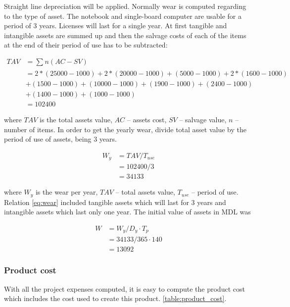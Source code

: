 Straight line depreciation will be applied. Normally wear is computed regarding to the type of asset. The notebook and single-board computer are usable for a period of 3 years. Licenses will last for a single year. At first tangible and intangible assets are summed up and then the salvage costs of each of the items at the end of their period of use has to be subtracted:

\begin{equation}
 \begin{split}
  TAV &= \sum_{} n(AC - SV) \\
        &= 2*(25000 - 1000)  + 2*(20000 - 1000) + (5000 - 1000) + 2*(1600 - 1000)\\&  + (1500 - 1000)+ (10000 - 1000) + (1900 - 1000) + (2400 - 1000)\\& + (1400 - 1000) + (1000 - 1000) \\
        &= 102400
 \end{split}
\end{equation}

\noindent
where $TAV$ is the total assets value, $AC$ -- assets cost, $SV$ -- salvage value, $n$ -- number of items. In order to get the yearly wear, divide total asset value by the period of use of assets, being 3 years.

\begin{equation} \label{eq:wear}
 \begin{split}
  W_y &= TAV / T_{use} \\
                &= 102400/3\\
                &= 34133
 \end{split}
\end{equation}

\noindent
where $W_y$ is the wear per year, $TAV$ -- total assets value, $T_{use}$ -- period of use. Relation \eqref{eq:wear} included tangible assets which will last for 3 years and intangible assets which last only one year. The initial value of assets in MDL was

\begin{equation}
 \begin{split}
  W &= W_y / D_y \cdot T_p\\
                   &= 34133  / 365  \cdot 140 \\
                   &= 13092
 \end{split}
\end{equation}

\subsubsection{Product cost}
With all the project expenses computed, it is easy to compute the product cost which includes the cost used to create this product. \ref{table:product_cost}.

